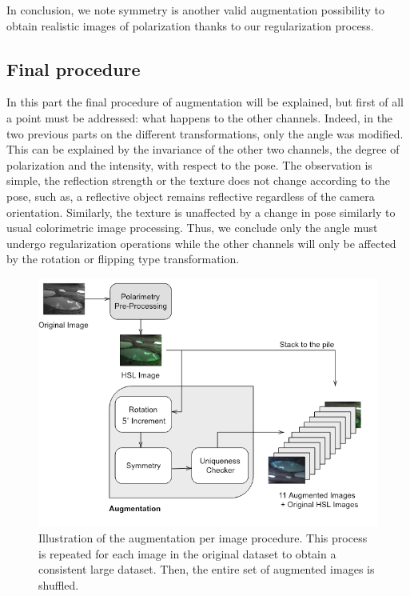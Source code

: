 In conclusion, we note symmetry is another valid augmentation possibility to obtain realistic images of polarization thanks to our regularization process.


\subsection{Final procedure}\label{fin_proc}

In this part the final procedure of augmentation will be explained, but first of all a point must be addressed: what happens to the other channels.
Indeed, in the two previous parts on the different transformations, only the angle was modified. This can be explained by the invariance of the other two channels, the degree of polarization and the intensity, with respect to the pose.
The observation is simple, the reflection strength or the texture does not change according to the pose, such as, a reflective object remains reflective regardless of the camera orientation. Similarly, the texture is unaffected by a change in pose similarly to usual colorimetric image processing.
Thus, we conclude only the angle must undergo regularization operations while the other channels will only be affected by the rotation or flipping type transformation.



\begin{figure}[h]
	\centering
	\includegraphics[width=.7\linewidth]{Figures/Aug/diagram-20190220.png}
	\caption[Illustration of the augmentation per image procedure.]{Illustration of the augmentation per image procedure. This process is repeated for each image in the original dataset to obtain a consistent large dataset. Then, the entire set of augmented images is shuffled.}\label{augment}
\end{figure}

